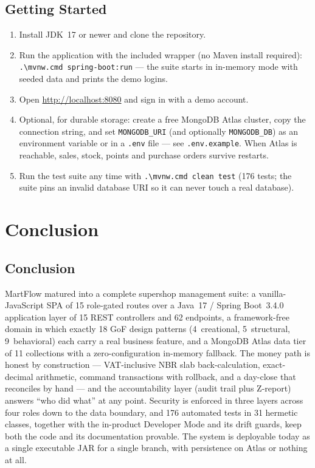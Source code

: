 \documentclass[12pt,a4paper]{report}
\begin{document}
\section{Getting Started}
\begin{enumerate}
  \item Install JDK~17 or newer and clone the repository.
  \item Run the application with the included wrapper (no Maven install required):
        \texttt{.\textbackslash mvnw.cmd spring-boot:run} --- the suite starts in
        in-memory mode with seeded data and prints the demo logins.
  \item Open \url{http://localhost:8080} and sign in with a demo account.
  \item Optional, for durable storage: create a free MongoDB Atlas cluster, copy the
        connection string, and set \texttt{MONGODB\_URI} (and optionally
        \texttt{MONGODB\_DB}) as an environment variable or in a \texttt{.env} file ---
        see \texttt{.env.example}. When Atlas is reachable, sales, stock, points and
        purchase orders survive restarts.
  \item Run the test suite any time with \texttt{.\textbackslash mvnw.cmd clean test}
        (176 tests; the suite pins an invalid database URI so it can never touch a real
        database).
\end{enumerate}

\chapter{Conclusion}

\section{Conclusion}
MartFlow matured into a complete supershop management suite: a vanilla-JavaScript SPA of
15 role-gated routes over a Java~17 / Spring Boot~3.4.0 application layer of 15 REST
controllers and 62 endpoints, a framework-free domain in which exactly 18 GoF design
patterns (4~creational, 5~structural, 9~behavioral) each carry a real business feature,
and a MongoDB Atlas data tier of 11 collections with a zero-configuration in-memory
fallback. The money path is honest by construction --- VAT-inclusive NBR slab
back-calculation, exact-decimal arithmetic, command transactions with rollback, and a
day-close that reconciles by hand --- and the accountability layer (audit trail plus
Z-report) answers ``who did what'' at any point. Security is enforced in three layers
across four roles down to the data boundary, and 176 automated tests in 31 hermetic
classes, together with the in-product Developer Mode and its drift guards, keep both the
code and its documentation provable. The system is deployable today as a single
executable JAR for a single branch, with persistence on Atlas or nothing at all.
\end{document}

